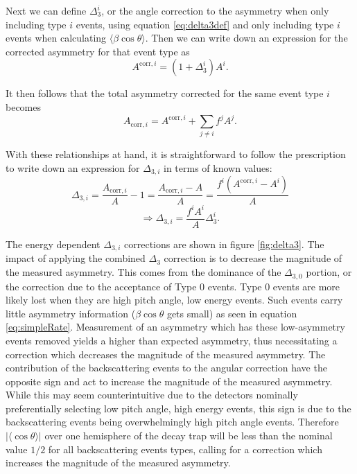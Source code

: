 Next we can define $\Delta^i_3$, or the angle correction to the asymmetry when only
including type $i$ events, using equation \ref{eq:delta3def} and only including
type $i$ events when calculating $\langle\beta\cos\theta\rangle$. Then we can write down
an expression for the corrected asymmetry for that event type as
%
\begin{equation}
A^{\mathrm{corr},i} = (1+\Delta^i_3)A^i.
\end{equation}

It then follows that the total asymmetry corrected for the same event type $i$ becomes
%
\begin{equation}
A_{\mathrm{corr},i} = A^{\mathrm{corr},i} + \sum_{j\neq i} f^jA^j.
\end{equation}

With these relationships at hand, it is straightforward to follow the prescription to write
down an expression for $\Delta_{3,i}$ in terms of known values:
%
\begin{equation*}
  \Delta_{3,i} = \frac{A_{\mathrm{corr},i}}{A} - 1 = \frac{A_{\mathrm{corr},i}-A}{A} =
  \frac{f^i(A^{\mathrm{corr},i}-A^i)}{A}
\end{equation*}
%
\begin{equation}
  \Rightarrow\Delta_{3,i} = \frac{f^iA^i}{A}\Delta^i_3.
\end{equation}
%

The energy dependent $\Delta_{3,i}$ corrections are shown in figure \ref{fig:delta3}.
The impact of applying the combined $\Delta_{3}$ correction is to decrease the magnitude of the
measured asymmetry. This comes from the dominance of the $\Delta_{3,0}$ portion, or the correction
due to the acceptance of Type 0 events. Type 0 events are more likely lost when they are high pitch
angle, low energy events. Such events carry little asymmetry information ($\beta\cos\theta$ gets small)
as seen in equation \ref{eq:simpleRate}. Measurement of an asymmetry which has these low-asymmetry events
removed yields a higher than expected asymmetry, thus necessitating a correction which decreases the
magnitude of the measured asymmetry. The contribution of the backscattering events to the angular
correction have the opposite sign and act to increase the magnitude of the measured asymmetry.
While this may seem counterintuitive due to the detectors nominally preferentially selecting
low pitch angle, high energy events, this sign is due to the backscattering events being overwhelmingly
high pitch angle events. Therefore $|\langle\cos\theta\rangle|$ over one hemisphere of the decay trap
will be less than the nominal value $1/2$ for all
backscattering events types, calling for a correction which increases the magnitude of the measured
asymmetry.

